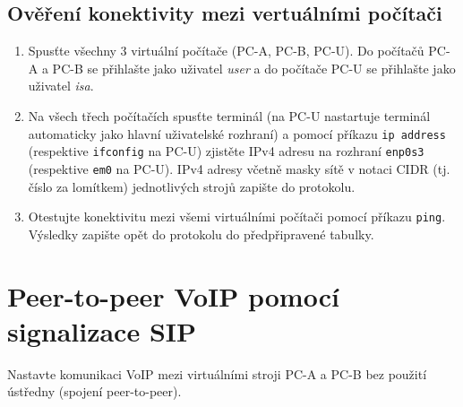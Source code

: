 \subsection{Ověření konektivity mezi vertuálními počítači}
\begin{enumerate}
	\item Spusťte všechny 3 virtuální počítače (PC-A, PC-B, PC-U). Do počítačů PC-A a PC-B se přihlašte jako uživatel \emph{user} a do počítače PC-U se přihlašte jako uživatel \emph{isa}.
	\item Na všech třech počítačích spusťte terminál (na PC-U nastartuje terminál automaticky jako hlavní uživatelské rozhraní) a pomocí příkazu \verb{ip address{ (respektive \verb{ifconfig{ na PC-U) zjistěte IPv4 adresu na rozhraní \verb{enp0s3{ (respektive \verb{em0{ na PC-U). IPv4 adresy včetně masky sítě v notaci CIDR (tj. číslo za lomítkem) jednotlivých strojů zapište do protokolu.
	\item Otestujte konektivitu mezi všemi virtuálními počítači pomocí příkazu \verb{ping{. Výsledky zapište opět do protokolu do předpřipravené tabulky.
\end{enumerate}


\section{Peer-to-peer VoIP pomocí signalizace SIP}
Nastavte komunikaci VoIP mezi virtuálními stroji PC-A a PC-B bez použití ústředny (spojení peer-to-peer).

